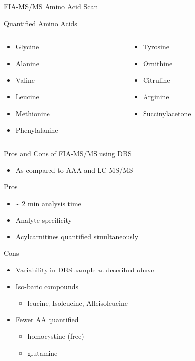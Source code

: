 \documentclass[presentation, smaller]{beamer}
\begin{document}
\begin{frame}[label={sec:orgheadline21}]{FIA-MS/MS Amino Acid Scan}
\begin{block}{Quantified Amino Acids}
\begin{columns}
\begin{column}{0.5\columnwidth}
\begin{itemize}
\item Glycine
\item Alanine
\item Valine
\item Leucine
\item Methionine
\item Phenylalanine
\end{itemize}
\end{column}
\begin{column}{0.5\columnwidth}
\begin{itemize}
\item Tyrosine
\item Ornithine
\item Citruline
\item Arginine
\item \color{blue}Succinylacetone
\end{itemize}
\end{column}
\end{columns}
\end{block}
\end{frame}


\begin{frame}[label={sec:orgheadline22}]{Pros and Cons of FIA-MS/MS using DBS}
\begin{itemize}
\item As compared to AAA and LC-MS/MS
\end{itemize}
\begin{block}{Pros}
\begin{itemize}
\item \textasciitilde{} 2 min analysis time
\item Analyte specificity
\item Acylcarnitines quantified simultaneously
\end{itemize}
\end{block}

\begin{block}{Cons}
\begin{itemize}
\item Variability in DBS sample as described above
\item Iso-baric compounds
\begin{itemize}
\item leucine, Isoleucine, Alloisoleucine
\end{itemize}
\item Fewer AA quantified
\begin{itemize}
\item homocystine (free)
\item glutamine
\end{itemize}
\end{itemize}
\end{block}
\end{frame}
\end{document}
